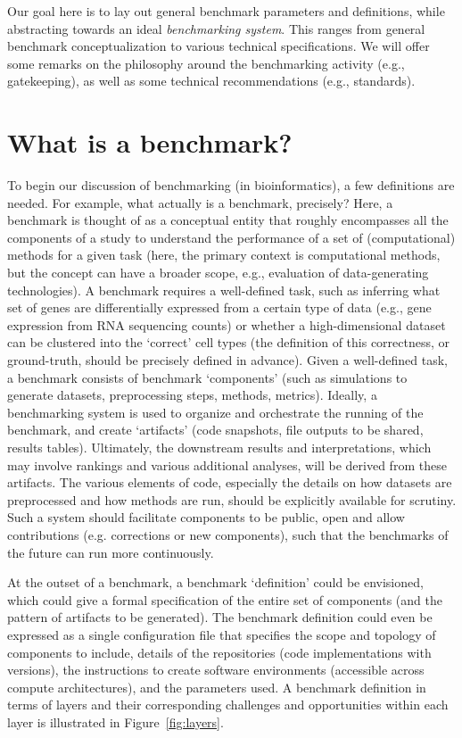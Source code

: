 \documentclass[11pt]{article}
\begin{document}
Our goal here is to lay out general benchmark parameters and definitions, while abstracting towards an ideal \textit{benchmarking system}. This ranges from general benchmark conceptualization to various technical specifications. We will offer some remarks on the philosophy around the benchmarking activity (e.g., gatekeeping), as well as some technical recommendations (e.g., standards).


\section*{What is a benchmark?}

To begin our discussion of benchmarking (in bioinformatics), a few definitions are needed. For example, what actually is a benchmark, precisely? Here, a benchmark is thought of as a conceptual entity that roughly encompasses all the components of a study to understand the performance of a set of (computational) methods for a given task (here, the primary context is computational methods, but the concept can have a broader scope, e.g., evaluation of data-generating technologies). A benchmark requires a well-defined task, such as inferring what set of genes are differentially expressed from a certain type of data (e.g., gene expression from RNA sequencing counts) or whether a high-dimensional dataset can be clustered into the `correct' cell types (the definition of this correctness, or ground-truth, should be precisely defined in advance). Given a well-defined task, a benchmark consists of benchmark `components' (such as simulations to generate datasets, preprocessing steps, methods, metrics). Ideally, a benchmarking system is used to organize and orchestrate the running of the benchmark, and create `artifacts' (code snapshots, file outputs to be shared, results tables). Ultimately, the downstream results and interpretations, which may involve rankings and various additional analyses, will be derived from these artifacts. The various elements of code, especially the details on how datasets are preprocessed and how methods are run, should be explicitly available for scrutiny. Such a system should facilitate components to be public, open and allow contributions (e.g. corrections or new components), such that the benchmarks of the future can run more continuously.

At the outset of a benchmark, a benchmark `definition' could be envisioned, which could give a formal specification of the entire set of components (and the pattern of artifacts to be generated). The benchmark definition could even be expressed as a single configuration file that specifies the scope and topology of components to include, details of the repositories (code implementations with versions), the instructions to create software environments (accessible across compute architectures), and the parameters used. A benchmark definition in terms of layers and their corresponding challenges and opportunities within each layer is illustrated in Figure~\ref{fig:layers}.
\end{document}
